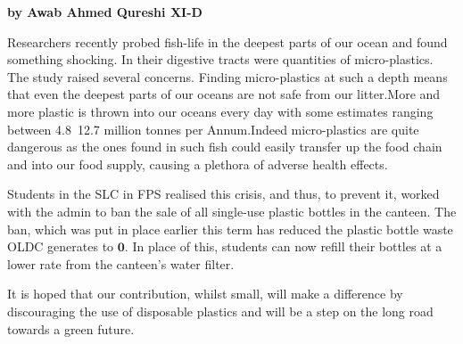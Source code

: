 \documentclass{article}
\date{February 2020}
\begin{document}
\maketitle
\large 


\textbf{by Awab Ahmed Qureshi XI-D}

Researchers recently probed fish-life in the deepest parts of our ocean and found something shocking. In their digestive tracts were quantities of micro-plastics. The study raised several concerns. Finding micro-plastics at such a depth means that even the deepest parts of our oceans are not safe from our litter.More and more plastic is thrown into our oceans every day with some estimates ranging between 4.8~12.7 million tonnes per Annum.\newline Indeed micro-plastics are quite dangerous as the ones found in such fish could easily transfer up the food chain and into our food supply, causing a plethora of adverse health effects.

Students in the SLC in FPS realised this crisis, and thus, to prevent it, worked with the admin to ban the sale of all single-use plastic bottles in the canteen. The ban, which was put in place earlier this term has reduced the plastic bottle waste OLDC generates to $\boldsymbol{0}$. In place of this, students can now refill their bottles at a lower rate from the canteen's water filter.

It is hoped that our contribution, whilst small, will make a difference by discouraging the use of disposable plastics and will be a step on the long road towards a green future. 



\end{document}
